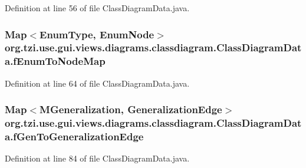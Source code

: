 Definition at line 56 of file Class\-Diagram\-Data.\-java.

\hypertarget{classorg_1_1tzi_1_1use_1_1gui_1_1views_1_1diagrams_1_1classdiagram_1_1_class_diagram_data_a130b05cf00a42f94ea57c2c82a952d8d}{
\subsubsection[{f\-Enum\-To\-Node\-Map}]{\setlength{\rightskip}{0pt plus 5cm}Map$<${\bf Enum\-Type}, {\bf Enum\-Node}$>$ org.\-tzi.\-use.\-gui.\-views.\-diagrams.\-classdiagram.\-Class\-Diagram\-Data.\-f\-Enum\-To\-Node\-Map}}\label{classorg_1_1tzi_1_1use_1_1gui_1_1views_1_1diagrams_1_1classdiagram_1_1_class_diagram_data_a130b05cf00a42f94ea57c2c82a952d8d}


Definition at line 64 of file Class\-Diagram\-Data.\-java.

\hypertarget{classorg_1_1tzi_1_1use_1_1gui_1_1views_1_1diagrams_1_1classdiagram_1_1_class_diagram_data_a7751426be219198d1b3859e39f0bdf72}{
\subsubsection[{f\-Gen\-To\-Generalization\-Edge}]{\setlength{\rightskip}{0pt plus 5cm}Map$<${\bf M\-Generalization}, {\bf Generalization\-Edge}$>$ org.\-tzi.\-use.\-gui.\-views.\-diagrams.\-classdiagram.\-Class\-Diagram\-Data.\-f\-Gen\-To\-Generalization\-Edge}}\label{classorg_1_1tzi_1_1use_1_1gui_1_1views_1_1diagrams_1_1classdiagram_1_1_class_diagram_data_a7751426be219198d1b3859e39f0bdf72}


Definition at line 84 of file Class\-Diagram\-Data.\-java.

